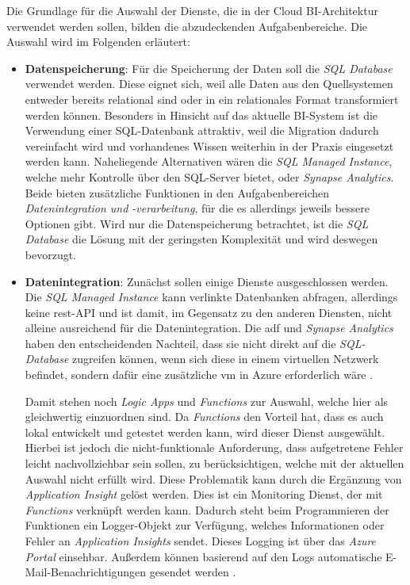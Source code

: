 Die Grundlage für die Auswahl der Dienste, die in der Cloud BI-Architektur verwendet werden sollen, bilden die abzudeckenden Aufgabenbereiche. Die Auswahl wird im Folgenden erläutert:
\begin{itemize}
\item \textbf{Datenspeicherung}: Für die Speicherung der Daten soll die \textit{SQL Database} verwendet werden. Diese eignet sich, weil alle Daten aus den Quellsystemen entweder bereits relational sind oder in ein relationales Format transformiert werden können. Besonders in Hinsicht auf das aktuelle BI-System ist die Verwendung einer SQL-Datenbank attraktiv, weil die Migration dadurch vereinfacht wird und vorhandenes Wissen weiterhin in der Praxis eingesetzt werden kann. Naheliegende Alternativen wären die \textit{SQL Managed Instance}, welche mehr Kontrolle über den SQL-Server bietet, oder \textit{Synapse Analytics}. Beide bieten zusätzliche Funktionen in den Aufgabenbereichen \textit{Datenintegration und -verarbeitung}, für die es allerdings jeweils bessere Optionen gibt. Wird nur die Datenspeicherung betrachtet, ist die \textit{SQL Database} die Lösung mit der geringsten Komplexität und wird deswegen bevorzugt.

\item \textbf{Datenintegration}: Zunächst sollen einige Dienste ausgeschlossen werden. Die \textit{SQL Managed Instance} kann verlinkte Datenbanken abfragen, allerdings keine \ac{rest}-API und ist damit, im Gegensatz zu den anderen Diensten, nicht alleine ausreichend für die Datenintegration. Die \ac{adf} und \textit{Synapse Analytics} haben den entscheidenden Nachteil, dass sie nicht direkt auf die \textit{SQL-Database} zugreifen können, wenn sich diese in einem virtuellen Netzwerk befindet, sondern dafür eine zusätzliche \ac{vm} in Azure erforderlich wäre \cite{msdoc_22_adf_integrationRuntime}.

Damit stehen noch \textit{Logic Apps} und \textit{Functions} zur Auswahl, welche hier als gleichwertig einzuordnen sind. Da \textit{Functions} den Vorteil hat, dass es auch lokal entwickelt und getestet werden kann, wird dieser Dienst ausgewählt. Hierbei ist jedoch die nicht-funktionale Anforderung, dass aufgetretene Fehler leicht nachvollziehbar sein sollen, zu berücksichtigen, welche mit der aktuellen Auswahl nicht erfüllt wird. Diese Problematik kann durch die Ergänzung von \textit{Application Insight} gelöst werden. Dies ist ein Monitoring Dienst, der mit \textit{Functions} verknüpft werden kann. Dadurch steht beim Programmieren der Funktionen ein Logger-Objekt zur Verfügung, welches Informationen oder Fehler an \textit{Application Insights} sendet. Dieses Logging ist über das \textit{Azure Portal} einsehbar. Außerdem können basierend auf den Logs automatische E-Mail-Benachrichtigungen gesendet werden \cite[vgl.][]{satapathi_hands-azure_2021}.


\end{itemize}
